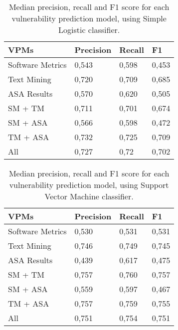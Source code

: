\documentclass[twocolumn,10pt]{asme2ej}
\begin{document}
\begin{table}[h]
\label{tab:SL_result}
\centering
\caption{Median precision, recall and F1 score for each vulnerability prediction model, using Simple Logistic classifier.}
\begin{tabular}{|l|l|l|l|} 
\hline
VPMs             & Precision & Recall & F1  \\ 
\hline
Software Metrics &      0,543    &   0,598   &  0,453  \\
Text Mining      &      0,720    &   0,709   &  0,685   \\
ASA Results      &      0,570    &   0,620   &  0,505   \\
SM + TM          &      0,711    &   0,701   &  0,674   \\
SM + ASA         &      0,566    &   0,598   &  0,472   \\
TM + ASA         &      0,732    &   0,725   &  0,709   \\
All              &      0,727    &   0,72    &  0,702    \\
\hline
\end{tabular}
\end{table}

\begin{table}[h]
\label{tab:SVM_result}
\centering
\caption{Median precision, recall and F1 score for each vulnerability prediction model, using Support Vector Machine classifier.}
\begin{tabular}{|l|l|l|l|} 
\hline
VPMs             & Precision & Recall & F1  \\ 
\hline
Software Metrics &      0,530     &   0,531     &  0,531  \\
Text Mining      &      0,746     &   0,749     &  0,745   \\
ASA Results      &      0,439     &   0,617     &  0,475   \\
SM + TM          &      0,757     &   0,760      & 0,757 \\
SM + ASA         &      0,559     &   0,597      & 0,467  \\
TM + ASA         &      0,757     &   0,759      & 0,755 \\
All              &      0,751     &   0,754      & 0,751    \\
                 
                 
                 
              
\hline
\end{tabular}
\end{table}
\end{document}
